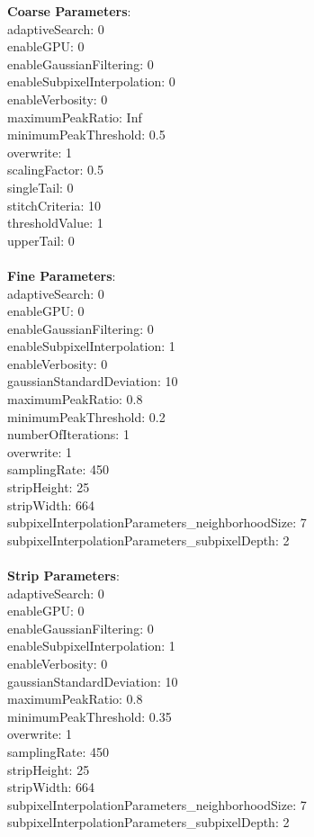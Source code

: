 \documentclass[11pt]{article}
\begin{document}
\textbf{Coarse Parameters}: \\
adaptiveSearch: 0\\
enableGPU: 0\\
enableGaussianFiltering: 0\\
enableSubpixelInterpolation: 0\\
enableVerbosity: 0\\
maximumPeakRatio: Inf\\
minimumPeakThreshold: 0.5\\
overwrite: 1\\
scalingFactor: 0.5\\
singleTail: 0\\
stitchCriteria: 10\\
thresholdValue: 1\\
upperTail: 0\\
\\
\textbf{Fine Parameters}: \\
adaptiveSearch: 0\\
enableGPU: 0\\
enableGaussianFiltering: 0\\
enableSubpixelInterpolation: 1\\
enableVerbosity: 0\\
gaussianStandardDeviation: 10\\
maximumPeakRatio: 0.8\\
minimumPeakThreshold: 0.2\\
numberOfIterations: 1\\
overwrite: 1\\
samplingRate: 450\\
stripHeight: 25\\
stripWidth: 664\\
subpixelInterpolationParameters\_neighborhoodSize: 7\\
subpixelInterpolationParameters\_subpixelDepth: 2\\
\\
\textbf{Strip Parameters}: \\
adaptiveSearch: 0\\
enableGPU: 0\\
enableGaussianFiltering: 0\\
enableSubpixelInterpolation: 1\\
enableVerbosity: 0\\
gaussianStandardDeviation: 10\\
maximumPeakRatio: 0.8\\
minimumPeakThreshold: 0.35\\
overwrite: 1\\
samplingRate: 450\\
stripHeight: 25\\
stripWidth: 664\\
subpixelInterpolationParameters\_neighborhoodSize: 7\\
subpixelInterpolationParameters\_subpixelDepth: 2\\
\\
\newpage
\end{document}
